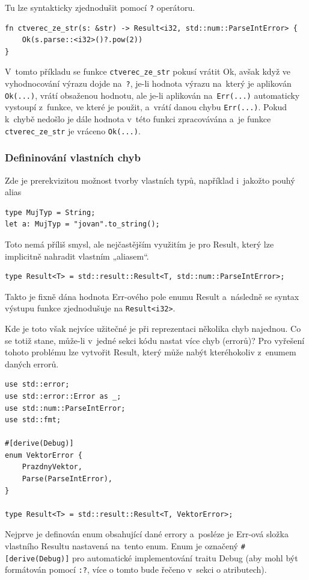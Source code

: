 \documentclass[a4paper, 12pt]{article} %
\newcommand{\rust}[1]{\texttt{#1}}
\begin{document}
		Tu lze syntakticky zjednodušit pomocí \rust{?} operátoru.
		\begin{verbatim}
fn ctverec_ze_str(s: &str) -> Result<i32, std::num::ParseIntError> {
	Ok(s.parse::<i32>()?.pow(2))
}
		\end{verbatim}

		V~tomto příkladu se funkce \rust{ctverec_ze_str} pokusí vrátit Ok, avšak když ve vyhodnocování výrazu dojde na~\rust{?}, je-li hodnota výrazu na~který je aplikován \rust{Ok(...)}, vrátí obsaženou hodnotu, ale je-li aplikován na~\rust{Err(...)} automaticky vystoupí z~funkce, ve které je použit, a~vrátí danou chybu \rust{Err(...)}. Pokud k~chybě nedošlo je dále hodnota v~této funkci zpracovávána a~je funkce \rust{ctverec_ze_str} je vráceno \rust{Ok(...)}.
		
		\subsubsection*{Defininování vlastních chyb}
			Zde je prerekvizitou možnost tvorby vlastních typů, například i~jakožto pouhý alias
			\begin{verbatim}
type MujTyp = String;
let a: MujTyp = "jovan".to_string();
			\end{verbatim}
		
			Toto nemá příliš smysl, ale nejčastějším využitím je pro Result, který lze implicitně nahradit vlastním „aliasem“.
			\begin{verbatim}
type Result<T> = std::result::Result<T, std::num::ParseIntError>;
			\end{verbatim}
			
			Takto je fixně dána hodnota Err-ového pole enumu Result a~následně se syntax výstupu funkce zjednodušuje na \rust{Result<i32>}.

			Kde je toto však nejvíce užitečné je při reprezentaci několika chyb najednou. Co se totiž stane, může-li v~jedné sekci kódu nastat více chyb (errorů)? Pro vyřešení tohoto problému lze vytvořit Result, který může nabýt kteréhokoliv z~enumem daných errorů.
			\begin{verbatim}
use std::error;
use std::error::Error as _;
use std::num::ParseIntError;
use std::fmt;

#[derive(Debug)]
enum VektorError {
	PrazdnyVektor,
	Parse(ParseIntError),
}

type Result<T> = std::result::Result<T, VektorError>;
			\end{verbatim}
			
			Nejprve je definován enum obsahující dané errory a~posléze je Err-ová složka vlastního Resultu nastavená na~tento enum. Enum je označený \rust{#[derive(Debug)]} pro automatické implementování traitu Debug (aby mohl být formátován pomocí \rust{:?}, více o tomto bude řečeno v~sekci o atributech).
			
\end{document}
